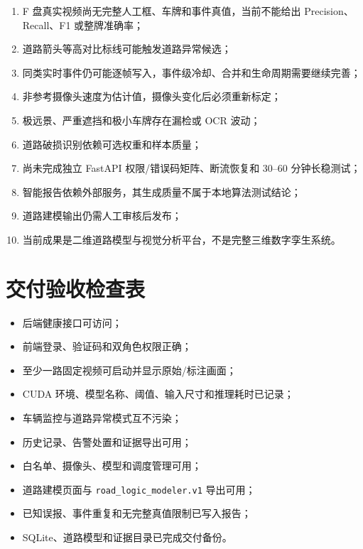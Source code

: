 \begin{enumerate}
\def\labelenumi{\arabic{enumi}.}
\tightlist
\item
  F 盘真实视频尚无完整人工框、车牌和事件真值，当前不能给出 Precision、Recall、F1 或整牌准确率；
\item
  道路箭头等高对比标线可能触发道路异常候选；
\item
  同类实时事件仍可能逐帧写入，事件级冷却、合并和生命周期需要继续完善；
\item
  非参考摄像头速度为估计值，摄像头变化后必须重新标定；
\item
  极远景、严重遮挡和极小车牌存在漏检或 OCR 波动；
\item
  道路破损识别依赖可选权重和样本质量；
\item
  尚未完成独立 FastAPI 权限/错误码矩阵、断流恢复和 30--60 分钟长稳测试；
\item
  智能报告依赖外部服务，其生成质量不属于本地算法测试结论；
\item
  道路建模输出仍需人工审核后发布；
\item
  当前成果是二维道路模型与视觉分析平台，不是完整三维数字孪生系统。
\end{enumerate}

\section{交付验收检查表}\label{manual-ux4ea4ux4ed8ux9a8cux6536ux68c0ux67e5ux8868}

\begin{itemize}
\tightlist
\item[$\square$]
  后端健康接口可访问；
\item[$\square$]
  前端登录、验证码和双角色权限正确；
\item[$\square$]
  至少一路固定视频可启动并显示原始/标注画面；
\item[$\square$]
  CUDA 环境、模型名称、阈值、输入尺寸和推理耗时已记录；
\item[$\square$]
  车辆监控与道路异常模式互不污染；
\item[$\square$]
  历史记录、告警处置和证据导出可用；
\item[$\square$]
  白名单、摄像头、模型和调度管理可用；
\item[$\square$]
  道路建模页面与 \texttt{road\_\allowbreak{}logic\_\allowbreak{}modeler.\allowbreak{}v1} 导出可用；
\item[$\square$]
  已知误报、事件重复和无完整真值限制已写入报告；
\item[$\square$]
  SQLite、道路模型和证据目录已完成交付备份。
\end{itemize}
